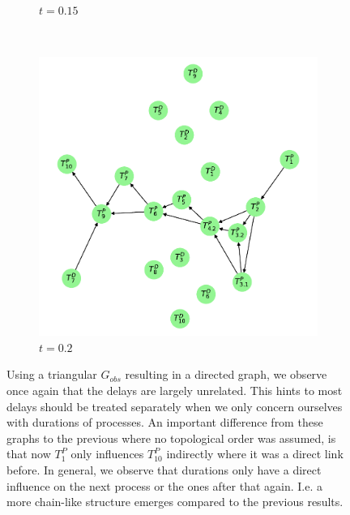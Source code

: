 \documentclass[../Thesis.tex]{subfiles}
\begin{document}
\begin{figure}[H]
\begin{subfigure}[t]{0.43\linewidth}
        \caption{$t = 0.15$}
        \label{subfig:G_dir times directed - graph - t 0.15}
    \end{subfigure}
    \\[\baselineskip]
    \begin{subfigure}[t]{0.43\linewidth}
        \includegraphics[width = \linewidth]{figures/Cycle data/G_dir times as graph - directed - 0_2.pdf}
        \caption{$t=0.2$}
        \label{subfig:G_dir times directed - graph - t 0.2}
    \end{subfigure}
    \caption{Using a triangular $G_{obs}$ resulting in a directed graph, we observe once again that the delays are largely unrelated. This hints to most delays should be treated separately when we only concern ourselves with durations of processes. An important difference from these graphs to the previous where no topological order was assumed, is that now $T^P_1$ only influences $T^P_{10}$ indirectly where it was a direct link before. In general, we observe that durations only have a direct influence on the next process or the ones after that again. I.e. a more chain-like structure emerges compared to the previous results.}
    \label{fig:G_dir times directed - graphs}
\end{figure}

\newpage
\end{document}
